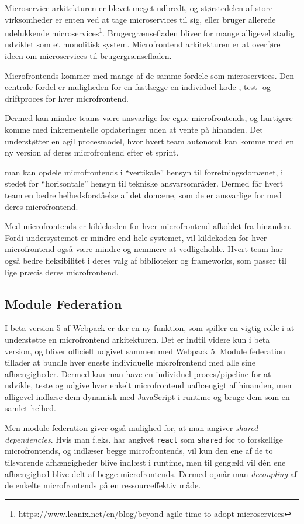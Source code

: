 \documentclass[]{article}
\begin{document}
Microservice arkitekturen er blevet meget udbredt, og størstedelen af
store virksomheder er enten ved at tage microservices til sig, eller
bruger allerede udelukkende microservices\footnote{\url{https://www.leanix.net/en/blog/beyond-agile-time-to-adopt-microservices}}.
Brugergrænsefladen bliver for mange alligevel stadig udviklet som et
monolitisk system. Microfrontend arkitekturen er at overføre ideen om
microservices til brugergrænsefladen.

Microfrontends kommer med mange af de samme fordele som microservices.
Den centrale fordel er muligheden for en fastlægge en individuel kode-,
test- og driftproces for hver microfrontend.

Dermed kan mindre teams være ansvarlige for egne microfrontends, og
hurtigere komme med inkrementelle opdateringer uden at vente på
hinanden. Det understøtter en agil procesmodel, hvor hvert team autonomt
kan komme med en ny version af deres microfrontend efter et sprint.

man kan opdele microfrontends i ``vertikale'' hensyn til
forretningsdomænet, i stedet for ``horisontale'' hensyn til tekniske
ansvarsområder. Dermed får hvert team en bedre helhedsforståelse af det
domæne, som de er ansvarlige for med deres microfrontend.

Med microfrontends er kildekoden for hver microfrontend afkoblet fra
hinanden. Fordi undersystemet er mindre end hele systemet, vil
kildekoden for hver microfrontend også være mindre og nemmere at
vedligeholde. Hvert team har også bedre fleksibilitet i deres valg af
biblioteker og frameworks, som passer til lige præcis deres
microfrontend.

\hypertarget{module-federation}{%
\subsection{Module Federation}\label{module-federation}}

I beta version 5 af Webpack er der en ny funktion, som spiller en vigtig
rolle i at understøtte en microfrontend arkitekturen. Det er indtil
videre kun i beta version, og bliver officielt udgivet sammen med
Webpack 5. Module federation tillader at bundle hver eneste individuelle
microfrontend med alle sine afhængigheder. Dermed kan man have en
individuel proces/pipeline for at udvikle, teste og udgive hver enkelt
microfrontend uafhængigt af hinanden, men alligevel indlæse dem dynamisk
med JavaScript i runtime og bruge dem som en samlet helhed.

Men module federation giver også mulighed for, at man angiver
\emph{shared dependencies}. Hvis man f.eks. har angivet \texttt{react}
som \texttt{shared} for to forskellige microfrontends, og indlæser begge
microfrontends, vil kun den ene af de to tilsvarende afhængigheder blive
indlæst i runtime, men til gengæld vil dén ene afhængighed blive delt af
begge microfrontends. Dermed opnår man \emph{decoupling} af de enkelte
microfrontends på en ressourceffektiv måde.
\end{document}
